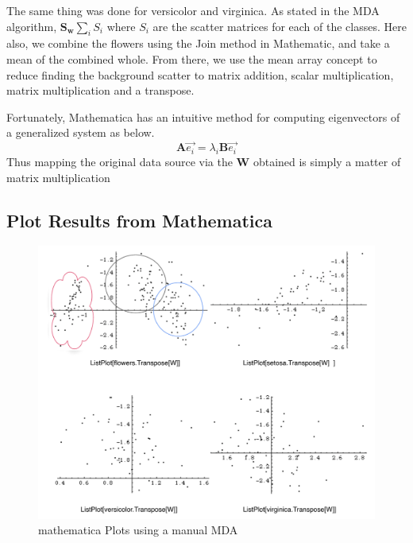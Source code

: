 The same thing was done for versicolor and virginica.  As stated in the MDA algorithm, $\mathbf{S_w} \sum_i S_i$ where $S_i$ are the scatter matrices for each of the classes.  Here also, we combine the flowers using the Join method in Mathematic, and take a mean of the combined whole.  From there, we use the mean array concept to reduce finding the background scatter to matrix addition, scalar multiplication, matrix multiplication and a transpose.  

Fortunately, Mathematica has an intuitive method for computing eigenvectors of a generalized system as below.
\[
\mathbf{A} \vec{e_i} = \lambda_i \mathbf{B} \vec{e_i}
\]
Thus mapping the original data source via the $\mathbf{W}$ obtained is simply a matter of matrix multiplication

\subsection{Plot Results from Mathematica}
\begin{figure}[htbp] %
   \centering
   \includegraphics[width=5in]{flowersMDA.pdf} 
   \caption{mathematica Plots using a manual MDA}
   \label{mathematicaPlotsUsingManualMDA}
\end{figure}
